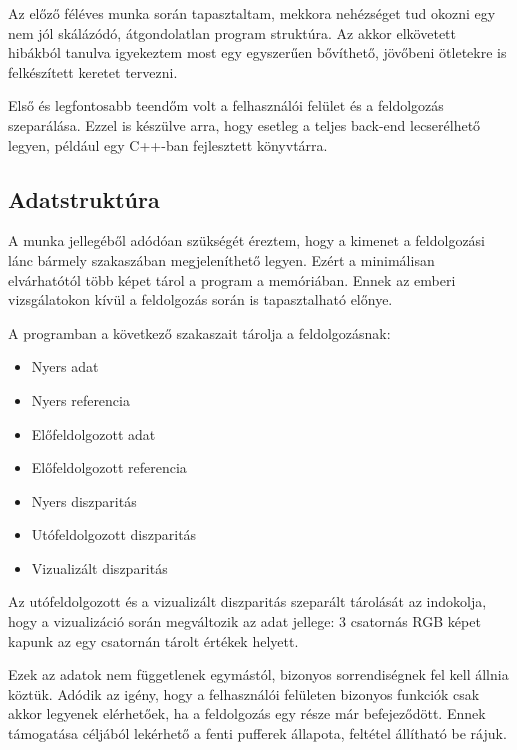 Az előző féléves munka során tapasztaltam, mekkora nehézséget tud okozni egy nem jól skálázódó, átgondolatlan program struktúra.
Az akkor elkövetett hibákból tanulva igyekeztem most egy egyszerűen bővíthető, jövőbeni ötletekre is felkészített keretet tervezni.

Első és legfontosabb teendőm volt a felhasználói felület és a feldolgozás szeparálása.
Ezzel is készülve arra, hogy esetleg a teljes back-end lecserélhető legyen, például egy C++-ban fejlesztett könyvtárra.

\subsection{Adatstruktúra}\label{sect:dataStructure}

A munka jellegéből adódóan szükségét éreztem, hogy a kimenet a feldolgozási lánc bármely szakaszában megjeleníthető legyen.
Ezért a minimálisan elvárhatótól több képet tárol a program a memóriában.
Ennek az emberi vizsgálatokon kívül a feldolgozás során is tapasztalható előnye.

A programban a következő szakaszait tárolja a feldolgozásnak:
\begin{itemize}[noitemsep]
	\item Nyers adat
	\item Nyers referencia
	\item Előfeldolgozott adat
	\item Előfeldolgozott referencia
	\item Nyers diszparitás
	\item Utófeldolgozott diszparitás
	\item Vizualizált diszparitás
\end{itemize}

Az utófeldolgozott és a vizualizált diszparitás szeparált tárolását az indokolja, hogy a vizualizáció során megváltozik az adat jellege: 3 csatornás RGB képet kapunk az egy csatornán tárolt értékek helyett.

Ezek az adatok nem függetlenek egymástól, bizonyos sorrendiségnek fel kell állnia köztük.
Adódik az igény, hogy a felhasználói felületen bizonyos funkciók csak akkor legyenek elérhetőek, ha a feldolgozás egy része már befejeződött.
Ennek támogatása céljából lekérhető a fenti pufferek állapota, feltétel állítható be rájuk.

